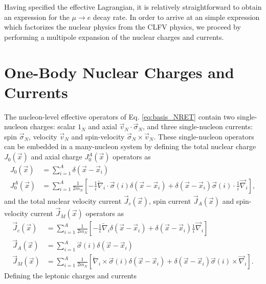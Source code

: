 \documentclass{book}[letterpaper,12pt]
\begin{document}
Having specified the effective Lagrangian, it is relatively straightforward to obtain an expression for the $\mu\rightarrow e$ decay rate. In order to arrive at an simple expression which factorizes the nuclear physics from the CLFV physics, we proceed by performing a multipole expansion of the nuclear charges and currents. 
\section{One-Body Nuclear Charges and Currents}
The nucleon-level effective operators of Eq. \ref{eq:basis_NRET} contain two single-nucleon charges: scalar $1_N$ and axial $\vec{v}_N\cdot\vec{\sigma}_N$, and three single-nucleon currents: spin $\vec{\sigma}_N$, velocity $\vec{v}_N$ and spin-velocity $\vec{\sigma}_N\times\vec{v}_N$. These single-nucleon operators can be embedded in a many-nucleon system by defining the total nuclear charge $J_0(\vec{x})$ and axial charge $J_0^A(\vec{x})$ operators as
\begin{equation}
\begin{split}
J_0(\vec{x})&=\sum_{i=1}^A \delta(\vec{x}-\vec{x}_i)\\
J_0^A(\vec{x})&=\sum_{i=1}^A \frac{1}{2m_N}\left[-\frac{1}{i}\overleftarrow{\nabla}_i\cdot\vec{\sigma}(i)\delta(\vec{x}-\vec{x}_i)+\delta(\vec{x}-\vec{x}_i)\vec{\sigma}(i)\cdot\frac{1}{i}\overrightarrow{\nabla}_i\right],
\end{split}
\end{equation}
and the total nuclear velocity current $\vec{J}_c(\vec{x})$, spin current $\vec{J}_A(\vec{x})$ and spin-velocity current $\vec{J}_M(\vec{x})$ operators as
\begin{equation}
\begin{split}
\vec{J}_c(\vec{x})&=\sum_{i=1}^A \frac{1}{2m_N}\left[-\frac{1}{i}\overleftarrow{\nabla}_i\delta(\vec{x}-\vec{x}_i)+\delta(\vec{x}-\vec{x}_i)\frac{1}{i}\overrightarrow{\nabla}_i\right]\\
\vec{J}_A(\vec{x})&=\sum_{i=1}^A\vec{\sigma}(i)\delta(\vec{x}-\vec{x}_i)\\
\vec{J}_M(\vec{x})&=\sum_{i=1}^A \frac{1}{2m_N}\left[\overleftarrow{\nabla}_i\times\vec{\sigma}(i)\delta(\vec{x}-\vec{x}_i)+\delta(\vec{x}-\vec{x}_i)\vec{\sigma}(i)\times\overrightarrow{\nabla}_i\right].
\end{split}
\end{equation}
Defining the leptonic charges and currents
\end{document}
